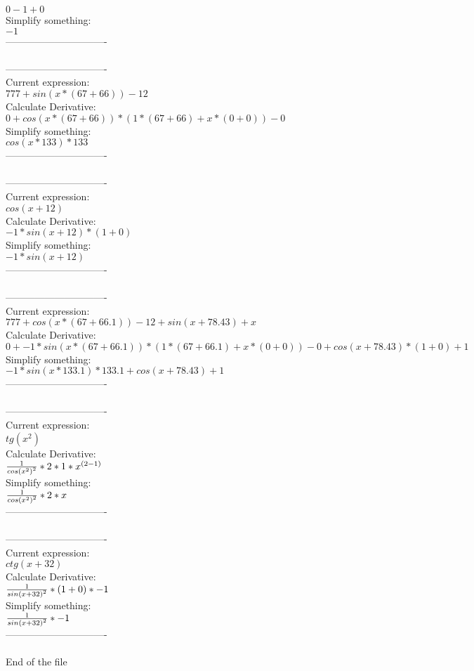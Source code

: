 \documentclass[12pt]{article}
\begin{document}
\( 0-1+0\) \\
Simplify something:\\
\( -1\) \\
-------------------------------\\
\\
-------------------------------\\
Current expression:\\
\( 777+sin(x*(67+66))-12\) \\
Calculate Derivative:\\
\( 0+cos(x*(67+66))*(1*(67+66)+x*(0+0))-0\) \\
Simplify something:\\
\( cos(x*133)*133\) \\
-------------------------------\\
\\
-------------------------------\\
Current expression:\\
\( cos(x+12)\) \\
Calculate Derivative:\\
\( -1*sin(x+12)*(1+0)\) \\
Simplify something:\\
\( -1*sin(x+12)\) \\
-------------------------------\\
\\
-------------------------------\\
Current expression:\\
\( 777+cos(x*(67+66.1))-12+sin(x+78.43)+x\) \\
Calculate Derivative:\\
\( 0+-1*sin(x*(67+66.1))*(1*(67+66.1)+x*(0+0))-0+cos(x+78.43)*(1+0)+1\) \\
Simplify something:\\
\( -1*sin(x*133.1)*133.1+cos(x+78.43)+1\) \\
-------------------------------\\
\\
-------------------------------\\
Current expression:\\
\( tg({{x}^{2}})\) \\
Calculate Derivative:\\
\( {{1}\over{{{cos({{x}^{2}})}^{2}}}}*2*1*{{x}^{(2-1)}}\) \\
Simplify something:\\
\( {{1}\over{{{cos({{x}^{2}})}^{2}}}}*2*x\) \\
-------------------------------\\
\\
-------------------------------\\
Current expression:\\
\( ctg(x+32)\) \\
Calculate Derivative:\\
\( {{1}\over{{{sin(x+32)}^{2}}}}*(1+0)*-1\) \\
Simplify something:\\
\( {{1}\over{{{sin(x+32)}^{2}}}}*-1\) \\
-------------------------------\\
\\

        End of the file
        
\end{document}
